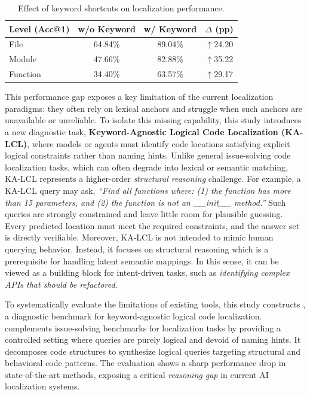 \begin{table}[t]
\centering
\caption{Effect of keyword shortcuts on localization performance.}
\label{tab:keyword_shortcut-dataloc}
\small
\renewcommand{\arraystretch}{1.1}
\begin{tabular*}{0.92\columnwidth}{@{\extracolsep{\fill}}lccc@{}}
\toprule
\textbf{Level (Acc@1)} & \textbf{w/o Keyword} & \textbf{w/ Keyword} & \textbf{$\Delta$ (pp)} \\
\midrule
File     & 64.84\% & 89.04\% & \textcolor{green!50!black}{$\uparrow$24.20} \\
Module   & 47.66\% & 82.88\% & \textcolor{green!50!black}{$\uparrow$35.22} \\
Function & 34.40\% & 63.57\% & \textcolor{green!50!black}{$\uparrow$29.17} \\
\bottomrule
\end{tabular*}
\end{table}

This performance gap exposes a key limitation of the current localization paradigms: they often
rely on lexical anchors and struggle when such anchors are unavailable or unreliable. To isolate
this missing capability, this study introduces a new diagnostic task, \textbf{Keyword-Agnostic Logical Code
Localization (KA-LCL)}, where models or agents must identify code locations satisfying explicit
logical constraints rather than naming hints. Unlike general issue-solving code localization tasks,
which can often degrade into lexical or semantic matching, KA-LCL represents a higher-order
\textit{structural reasoning} challenge. For example, a KA-LCL query may ask, \textit{``Find all
functions where: (1) the function has more than 15 parameters, and (2) the function is not an
\_\_init\_\_ method.''} Such queries are strongly constrained and leave little room for plausible
guessing. Every predicted location must meet the required constraints, and the answer set is
directly verifiable. Moreover, KA-LCL is not intended to mimic human querying behavior. Instead, it
focuses on structural reasoning which is a prerequisite for handling latent semantic mappings. In
this sense, it can be viewed as a building block for intent-driven tasks, such as
\textit{identifying complex APIs that should be refactored}.

To systematically evaluate the limitations of existing tools, this study constructs \dataset, a diagnostic benchmark for keyword-agnostic logical code localization. \dataset complements issue-solving benchmarks for localization tasks by providing a controlled setting where queries are purely logical and devoid of naming hints. It decomposes code structures to synthesize logical queries targeting structural and behavioral code patterns. The evaluation shows a sharp performance drop in state-of-the-art methods, exposing a critical \textit{reasoning gap} in current AI localization systems.


